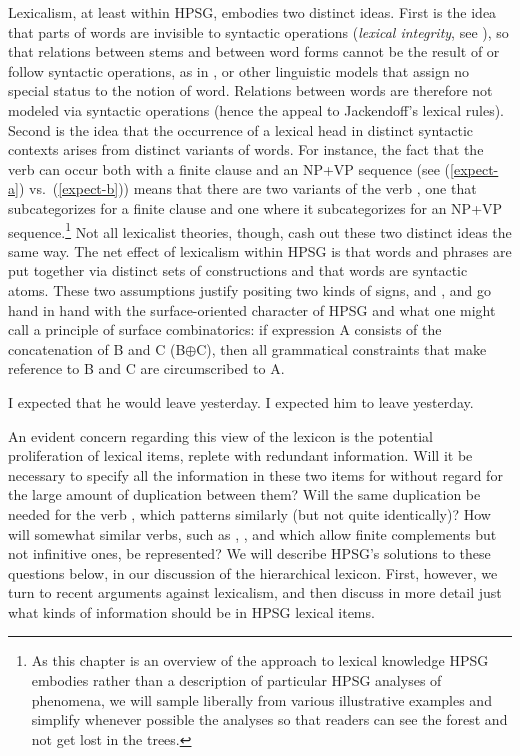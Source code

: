 \documentclass[output=paper
	        ,collection
	        ,collectionchapter
 	        ,biblatex
                ,babelshorthands
                ,newtxmath
                ,draftmode
                ,colorlinks, citecolor=brown
]{langscibook}
\begin{document}
Lexicalism, at least within HPSG, embodies two distinct ideas. First is the idea that parts of words
are invisible to syntactic operations (\emph{lexical integrity}, see
\citealt{BresnanandMchombo1995}), so that relations between stems and between word forms cannot be
the result of or follow syntactic operations, as in 
\citep{HalleandMarantz1993}, or other linguistic models that assign no special status to the notion
of word. Relations between words are therefore not modeled via syntactic operations (hence the
appeal to Jackendoff's lexical rules). Second is the idea that the occurrence of a lexical head in distinct syntactic contexts arises from distinct variants of words. For instance, the fact that the verb  can occur both with a finite clause and an NP+VP sequence (see (\ref{expect-a}) vs.\ (\ref{expect-b})) means that there are two variants of the verb , one that subcategorizes for a finite clause and one where it subcategorizes for an NP+VP sequence.\footnote{As this chapter is an overview of the approach to lexical knowledge HPSG embodies rather than a description of particular HPSG analyses of phenomena, we will sample liberally from various illustrative examples and simplify whenever possible the analyses so that readers can see the forest and not get lost in the trees.} Not all lexicalist theories, though, cash out these two distinct ideas the same way. The net effect of lexicalism within HPSG is that words and phrases are put together via distinct sets of constructions and that words are syntactic atoms. These two assumptions justify positing two kinds of signs,  and , and go hand in hand with the surface-oriented character of HPSG and what one might call a principle of surface combinatorics: if expression A consists of the concatenation of B and C (B$\oplus$C), then all grammatical constraints that make reference to B and C are circumscribed to A. 

\begin{exe}
	\ex \label{expect-b} I expected that he would leave yesterday.
	\ex \label{expect-a} I expected him to leave yesterday.
\end{exe}

An evident concern regarding this view of the lexicon is the potential proliferation of lexical items, replete with redundant information. Will it be necessary to specify all the information in these two items for  without regard for the large amount of duplication between them? Will the same duplication be needed for the verb  , which patterns similarly (but not quite identically)? How will somewhat similar verbs, such as , , and  which allow finite complements but not infinitive ones, be represented? We will describe HPSG's solutions to these questions below, in our discussion of the hierarchical lexicon. First, however, we turn to recent arguments against lexicalism, and then discuss in more detail just what kinds of information should be in HPSG lexical items.
\end{document}

